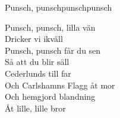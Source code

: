 \begin{song}{Punsch, punsch}{punschpunsch}
\begin{vers}
Punsch, punsch, lilla vän\\
Dricker vi ikväll\\
Punsch, punsch får du sen\\
Så att du blir säll\\
Cederlunds till far\\
Och Carlshamns Flagg åt mor\\
Och hemgjord blandning\\
Åt lille, lille bror\\
\end{vers}
\end{song}
